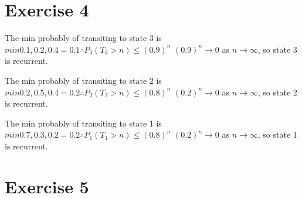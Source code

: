 \documentclass{article}\usepackage[]{graphicx}\usepackage[]{color}
\begin{document}
\section*{Exercise 4}
The min probably of transiting to state 3 is $min{0.1, 0.2,0.4}=0.1\therefore P_{3}(T_{3}>n)\leq (0.9)^{n}$
$(0.9)^{n} \rightarrow 0$ as $n \rightarrow \infty$, so state 3 is recurrent.

The min probably of transiting to state 2 is $min{0.2, 0.5,0.4}=0.2\therefore P_{2}(T_{2}>n)\leq (0.8)^{n}$
$(0.2)^{n} \rightarrow 0$ as $n \rightarrow \infty$, so state 2 is recurrent.

The min probably of transiting to state 1 is $min{0.7, 0.3,0.2}=0.2\therefore P_{1}(T_{1}>n)\leq (0.8)^{n}$
$(0.2)^{n} \rightarrow 0$ as $n \rightarrow \infty$, so state 1 is recurrent.

\section*{Exercise 5}
\end{document}
